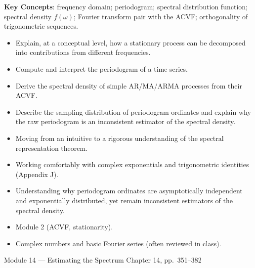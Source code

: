 \documentclass[11pt]{article}
\newcommand{\keyconcepts}{\textbf{\color{modblue}Key Concepts}}
\begin{document}
\keyconcepts: frequency domain; periodogram; spectral distribution function; spectral density $f(\omega)$; Fourier transform pair with the ACVF; orthogonality of trigonometric sequences.

\begin{objectives}
\begin{itemize}
  \item Explain, at a conceptual level, how a stationary process can be decomposed into contributions from different frequencies.
  \item Compute and interpret the periodogram of a time series.
  \item Derive the spectral density of simple AR/MA/ARMA processes from their ACVF.
  \item Describe the sampling distribution of periodogram ordinates and explain why the raw periodogram is an inconsistent estimator of the spectral density.
\end{itemize}
\end{objectives}

\begin{difficult}
\begin{itemize}
  \item Moving from an intuitive to a rigorous understanding of the spectral representation theorem.
  \item Working comfortably with complex exponentials and trigonometric identities (Appendix J).
  \item Understanding why periodogram ordinates are asymptotically independent and exponentially distributed, yet remain inconsistent estimators of the spectral density.
\end{itemize}
\end{difficult}

\begin{prereqs}
\begin{itemize}
  \item Module 2 (ACVF, stationarity).
  \item Complex numbers and basic Fourier series (often reviewed in class).
\end{itemize}
\end{prereqs}

\vspace{6pt}
\begin{moduletitle}{Module 14 --- Estimating the Spectrum}
\small Chapter 14, pp.\ 351--382
\end{moduletitle}
\end{document}
